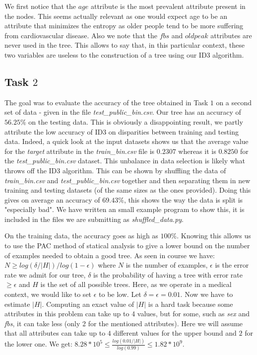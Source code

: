 \documentclass[9pt]{extarticle}
\begin{document}
	We first notice that the $age$ attribute is the most prevalent attribute present in the nodes. This seems actually relevant as one would expect age to be an attribute that minimizes the entropy as older people tend to be more suffering from cardiovascular disease. Also we note that the $fbs$ and $oldpeak$ attributes are never used in the tree. This allows to say that, in this particular context, these two variables are useless to the construction of a tree using our ID3 algorithm.
		
		
\subsection{Task $2$}
	The goal was to evaluate the accuracy of the tree obtained in Task $1$ on a second set of data - given in the file \emph{test\_public\_bin.csv}.
	Our tree has an accuracy of $56.25\%$ on the testing data. This is obviously a disappointing result, we partly attribute the low accuracy of ID3 on disparities between training and testing data. Indeed, a quick look at the input datasets shows us that the average value for the \emph{target} attribute in the \emph{train\_bin.csv} file is $0.2307$ whereas it is $0.8250$ for the \emph{test\_public\_bin.csv} dataset. This unbalance in data selection is likely what throws off the ID3 algorithm. This can be shown by shuffling the data of \emph{train\_bin.csv} and \emph{test\_public\_bin.csv} together and then separating them in new training and testing datasets (of the same sizes as the ones provided). Doing this gives on average an accuracy of $69.43\%$, this shows the way the data is split is "especially bad". We have written an small example program to show this, it is included in the files we are submitting as \emph{shuffled\_data.py}.
	
	On the training data, the accuracy goes as high as $100\%$. Knowing this allows us to use the PAC method of statical analysis to give a lower bound on the number of examples needed to obtain a good tree. As seen in course we have:
	$N\geq{log(\delta/|H|)}/{log(1-\epsilon)}$
where $N$ is the number of examples, $\epsilon$ is the error rate we admit for our tree, $\delta$ is the probability of having a tree with error rate $\geq\epsilon$ and $H$ is the set of all possible trees. Here, as we operate in a medical context, we would like to set $\epsilon$  to be low. Let $\delta=\epsilon= 0.01$. Now we have to estimate $|H|$. Computing an exact value of $|H|$ is a hard task because some attributes in this problem can take up to 4 values, but for some, such as \emph{sex} and \emph{fbs}, it can take less (only 2 for the mentioned attributes). Here we will assume that all attributes can take up to $4$ different values for the upper bound and $2$ for the lower one. We get: $8.28*10^5\leq\frac{log(0.01/|H|)}{log(0.99)}\leq1.82*10^9.$ \\
	
\end{document}
